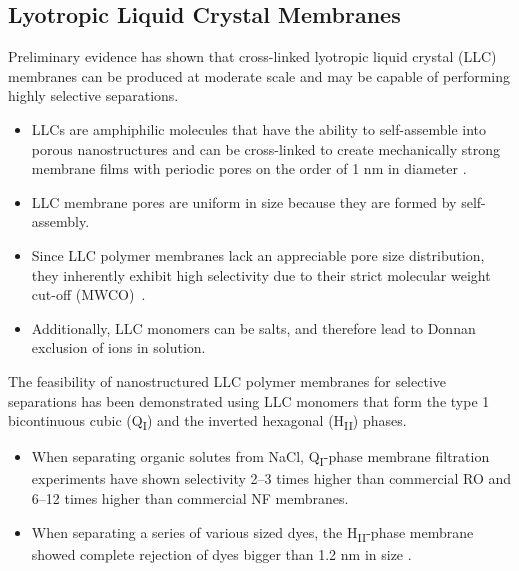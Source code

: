 \documentclass{article}
\begin{document}
  \subsection*{Lyotropic Liquid Crystal Membranes}
  
  Preliminary evidence has shown that cross-linked lyotropic liquid crystal
  (LLC) membranes can be produced at moderate scale and may be capable of 
  performing highly selective separations. 
  \begin{itemize}  
    \item LLCs are amphiphilic molecules that have the ability to self-assemble
    into porous nanostructures \cite{smith_ordered_1997} and can be cross-linked
    to create mechanically strong membrane films with periodic pores on the
    order of 1 nm in diameter \cite{zhou_supported_2005}. 
    \item LLC membrane pores are uniform in size because they are formed by 
    self-assembly. 
    \item Since LLC polymer membranes lack an appreciable pore size distribution,
    they inherently exhibit high selectivity due to their strict molecular weight
    cut-off (MWCO)~\cite{zhou_supported_2005}. 
    \item Additionally, LLC monomers can be salts, and therefore lead to Donnan
    exclusion of ions in solution.\cite{donnan_theory_1995}
  \end{itemize}

  The feasibility of nanostructured LLC polymer membranes for selective separations
  has been demonstrated using LLC monomers that form the type 1 bicontinuous cubic
  (Q\textsubscript{I})\cite{hatakeyama_water_2011,hatakeyama_nanoporous_2010,carter_glycerol-based_2012}
  and the inverted hexagonal (H\textsubscript{II}) \cite{zhou_supported_2005}
  phases. 
  \begin{itemize}
    \item When separating organic solutes from NaCl, Q\textsubscript{I}-phase
    membrane filtration experiments have shown selectivity 2--3 times higher than
    commercial RO and 6--12 times higher than commercial NF membranes.\cite{dischinger_application_2017}
    \item When separating a series of various sized dyes, the 
    H\textsubscript{II}-phase membrane showed complete rejection of dyes bigger
    than 1.2 nm in size \cite{zhou_supported_2005}.
  \end{itemize}
\end{document}
